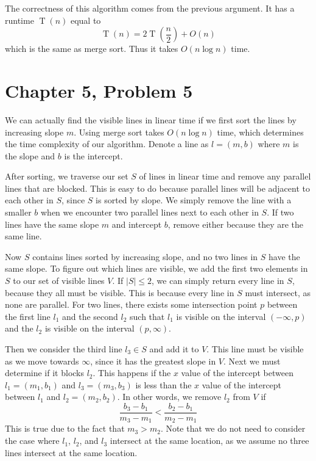 \documentclass[12pt]{article}
\begin{document}
The correctness of this algorithm comes from the previous argument. It has a runtime \(\operatorname{T}(n)\) equal to
\[\operatorname{T}(n)=2\operatorname{T}\left(\frac{n}{2}\right)+O(n)\]
which is the same as merge sort. Thus it takes \(O(n\log n)\) time.

\pagebreak

\section*{Chapter 5, Problem 5}

We can actually find the visible lines in linear time if we first sort the lines by increasing slope \(m\).
Using merge sort takes \(O(n\log n)\) time, which determines the time complexity of our algorithm. Denote a line as
\(l=(m,b)\) where \(m\) is the slope and \(b\) is the intercept.

After sorting, we traverse our set \(S\) of lines in linear time and remove any parallel lines that are blocked.
This is easy to do because parallel lines will be adjacent to each other in \(S\), since \(S\) is sorted by slope.
We simply remove the line with a smaller \(b\) when we encounter two parallel lines next to each other in \(S\).
If two lines have the same slope \(m\) and intercept \(b\), remove either because they are the same line.

Now \(S\) contains lines sorted by increasing slope, and no two lines in \(S\) have the same slope. To figure out which
lines are visible, we add the first two elements in \(S\) to our set of visible lines \(V\). If \(|S|\leq 2\), we can simply
return every line in \(S\), because they all must be visible. This is because every line in \(S\) must intersect, as none
are parallel. For two lines, there exists some intersection point \(p\) between the first line \(l_1\) and the second \(l_2\) such that \(l_1\) is
visible on the interval \((-\infty, p)\) and the \(l_2\) is visible on the interval \((p,\infty)\).

Then we consider the third line \(l_3\in S\) and add it to \(V\). This line must be visible as we move towards \(\infty\), since it has
the greatest slope in \(V\). Next we must determine if it blocks \(l_2\). This happens if the \(x\) value of the intercept between
\(l_1=(m_1,b_1)\) and \(l_3=(m_3,b_3)\) is less than the \(x\) value of the intercept between \(l_1\) and \(l_2=(m_2,b_2)\). In other words,
we remove \(l_2\) from \(V\) if
\[\frac{b_3-b_1}{m_3-m_1}<\frac{b_2-b_1}{m_2-m_1}\]
This is true due to the fact that \(m_3>m_2\). Note that we do not need to consider the case where \(l_1\), \(l_2\), and \(l_3\)
intersect at the same location, as we assume no three lines intersect at the same location.
\end{document}
